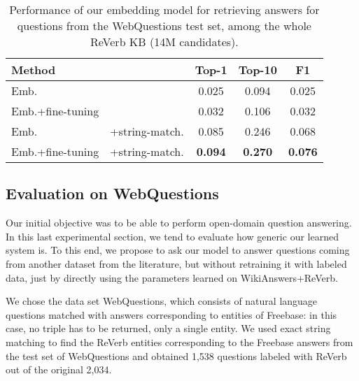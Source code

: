 \documentclass[runningheads,a4paper]{llncs}
\newcommand{\fb}{{\sc Freebase}\xspace}
\newcommand{\rv}{{\sc ReVerb}\xspace}
\newcommand{\wq}{{\sc WebQuestions}\xspace}
\newcommand{\wkrv}{{\sc WikiAnswers+ReVerb}\xspace}
\begin{document}
\begin{table}
\caption{Performance of our embedding model for retrieving answers for questions from the \wq test set, among the whole \rv KB (14M candidates).}
\label{tab:resfull-webq}
\vskip -0.1in
\begin{center}
\begin{small}
\begin{tabular}{|l@{}l|@{\:\:}c@{\:\:}c@{\:\:}|c@{\:\:}|}
\hline
{\bf Method} && {\bf Top-1} & {\bf Top-10} & {\bf F1}\\
\hline
Emb. && 0.025 & 0.094 &  0.025\\
Emb.+fine-tuning && 0.032 & 0.106 & 0.032\\
\hline
Emb. &+string-match. & 0.085 & 0.246& 0.068\\
Emb.+fine-tuning &+string-match. & {\bf 0.094} & {\bf 0.270} & {\bf 0.076} \\
\hline
\end{tabular}
\end{small}
\end{center}
\vskip -0.2in
\end{table}

\subsection{Evaluation on WebQuestions}

Our initial objective was to be able to perform open-domain question answering. 
In this last experimental section, we tend to evaluate how generic our learned system is.
To this end, we propose to ask our model to answer questions coming from another dataset from the literature, but without retraining it with labeled data, just by directly using the parameters learned on \wkrv.

We chose the data set \wq \cite{berant-EtAl:2013:EMNLP}, which consists of natural language questions matched with answers corresponding to entities of \fb: in this case, no triple has to be returned, only a single entity.
We used exact string matching to find the \rv entities corresponding to the \fb answers from the test set of \wq  and obtained 1,538 questions labeled with \rv out of the original 2,034.
\end{document}
